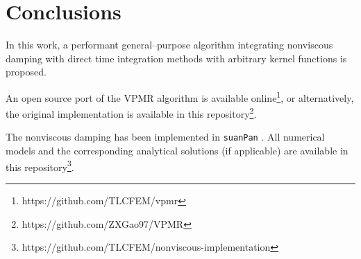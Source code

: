 \section{Conclusions}
In this work, a performant general--purpose algorithm integrating nonviscous damping with direct time integration methods with arbitrary kernel functions is proposed.

An open source port of the VPMR algorithm is available online\footnote{https://github.com/TLCFEM/vpmr}, or alternatively, the original implementation is available in this repository\footnote{https://github.com/ZXGao97/VPMR}.

The nonviscous damping has been implemented in \texttt{suanPan} \citep{Chang2023}. All numerical models and the corresponding analytical solutions (if applicable) are available in this repository\footnote{https://github.com/TLCFEM/nonviscous-implementation}.